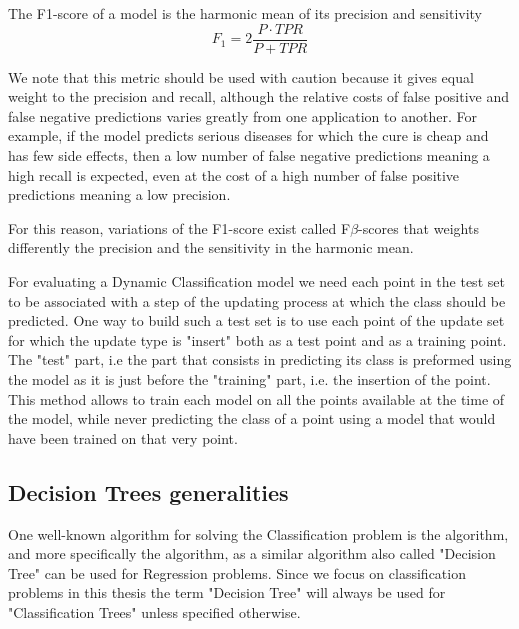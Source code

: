 \begin{definition}[F1-score]
    The F1-score of a model is the harmonic mean of its precision and sensitivity
    \begin{equation}
        F_1 = 2\frac{P \cdot TPR}{P + TPR}
    \end{equation}
\end{definition}

We note that this metric should be used with caution because it gives equal weight to the precision and recall, although the relative costs of false positive and false negative predictions varies greatly from one application to another. For example, if the model predicts serious diseases for which the cure is cheap and has few side effects, then a low number of false negative predictions meaning a high recall is expected, even at the cost of a high number of false positive predictions meaning a low precision.

For this reason, variations of the F1-score exist called F$\beta$-scores that weights differently the precision and the sensitivity in the harmonic mean.

For evaluating a Dynamic Classification model we need each point in the test set to be associated with a step of the updating process at which the class should be predicted. One way to build such a test set is to use each point of the update set for which the update type is "insert" both as a test point and as a training point. The "test" part, i.e the part that consists in predicting its class is preformed using the model as it is just before the "training" part, i.e. the insertion of the point. This method allows to train each model on all the points available at the time of the model, while never predicting the class of a point using a model that would have been trained on that very point.

\subsection{Decision Trees generalities}\label{sec:decision_trees_general}
One well-known algorithm for solving the Classification problem is the  algorithm, and more specifically the  algorithm, as a similar algorithm also called "Decision Tree" can be used for Regression problems. Since we focus on classification problems in this thesis the term "Decision Tree" will always be used for "Classification Trees" unless specified otherwise.

